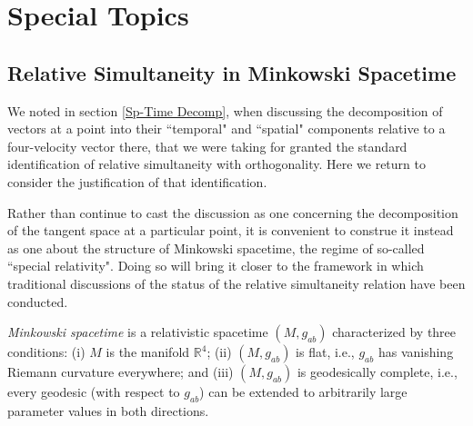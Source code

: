 \documentclass [12] {article}
\theoremstyle{plain}
\numberwithin{figure}{subsection}
\numberwithin{proposition}{subsection}
\begin{document}





\section{Special Topics}

\subsection{Relative Simultaneity in Minkowski Spacetime}\label{simultaneity}

We noted in section \ref{Sp-Time Decomp}, when discussing the decomposition of vectors at a point into their ``temporal" and ``spatial" components relative to a four-velocity vector there, that we were taking for granted the standard identification  of relative simultaneity with orthogonality.  Here we return to consider the justification of that identification.

Rather than continue to cast the discussion as one concerning the decomposition of the tangent space at a particular point, it is  convenient to construe it instead as one about the structure of Minkowski spacetime, the regime of so-called ``special relativity".    Doing so will bring it closer to the framework in which traditional discussions of the status  of the relative simultaneity relation have been conducted.
 
 \emph{Minkowski spacetime} is a relativistic spacetime $(M, g_{ab})$ characterized by three conditions:  (i) $M$ is the manifold $\mathbb{R}^4 $;  (ii) $(M, g_{ab})$ is flat, i.e.,  $g_{ab}$ has vanishing  Riemann curvature everywhere; and (iii)  $(M, g_{ab})$ is geodesically complete, i.e., every geodesic (with respect to $g_{ab}$) can be extended to arbitrarily large parameter values in both directions.  
\end{document}

